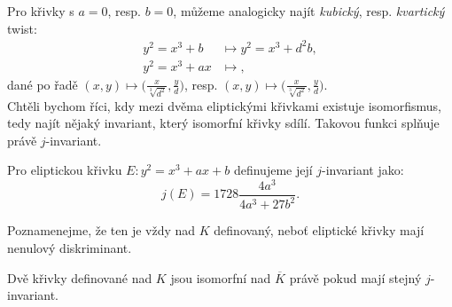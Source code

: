 \documentclass [12pt]{report}
\begin{document}
Pro křivky s $a=0$, resp. $b=0$, můžeme analogicky najít \textit{kubický}, resp. \textit{kvartický} twist:
\begin{align*}
y^2 = x^3 + b &\mapsto y^2 = x^3 + d^2 b ,\\
y^2 = x^3 +ax &\mapsto,
\end{align*}
dané po řadě $(x,y)  \mapsto \big(\frac{x}{\sqrt[3]{d^2}}, \frac{y}{d}\big)$, resp. $(x,y)  \mapsto \big(\frac{x}{\sqrt[3]{d^2}}, \frac{y}{d}\big)$.\\


Chtěli bychom říci, kdy mezi dvěma eliptickými křivkami existuje isomorfismus, tedy najít nějaký invariant, který isomorfní křivky sdílí. Takovou funkci splňuje právě $j$-invariant.

\begin{definice}
Pro eliptickou křivku $E: y^2 = x^3 + ax + b$ definujeme její $j$-invariant jako:
\begin{equation*}
j(E) = 1728 \frac{4a^3}{4a^3+27b^2}.
\end{equation*}
\end{definice}
Poznamenejme, že ten je vždy nad $K$ definovaný, neboť eliptické křivky mají nenulový diskriminant.
\begin{veta}
Dvě křivky definované nad $K$ jsou isomorfní nad $\overline{K}$ právě pokud mají stejný $j$-invariant.
\end{veta}
\end{document}
